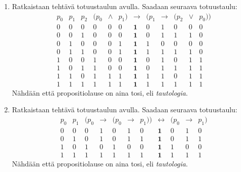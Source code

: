 \documentclass[12pt,a4paper]{article}
\begin{document}
\begin{solution}
\leavevmode\par
\begin{enumerate}[label=\alph*), nosep]
\item Ratkaistaan tehtävä totuustaulun avulla. Saadaan seuraava totuustaulu:
\[
\begin{array}{ccc|ccccccccc}
p_0 & p_1 & p_2
& (p_0 & \land & p_1)
& \boldsymbol{\to}
& (p_1 & \to & (p_2 & \lor & p_0)) \\
\hline
0 & 0 & 0
& 0 & 0 & 0
& \mathbf{1}
& 0 & 1 & 0 & 0 & 0 \\

0 & 0 & 1
& 0 & 0 & 0
& \mathbf{1}
& 0 & 1 & 1 & 1 & 0 \\

0 & 1 & 0
& 0 & 0 & 1
& \mathbf{1}
& 1 & 0 & 0 & 0 & 0 \\

0 & 1 & 1
& 0 & 0 & 1
& \mathbf{1}
& 1 & 1 & 1 & 1 & 0 \\

1 & 0 & 0
& 1 & 0 & 0
& \mathbf{1}
& 0 & 1 & 0 & 1 & 1 \\

1 & 0 & 1
& 1 & 0 & 0
& \mathbf{1}
& 0 & 1 & 1 & 1 & 1 \\

1 & 1 & 0
& 1 & 1 & 1
& \mathbf{1}
& 1 & 1 & 0 & 1 & 1 \\

1 & 1 & 1
& 1 & 1 & 1
& \mathbf{1}
& 1 & 1 & 1 & 1 & 1
\end{array}
\]
Nähdään että propositiolause on aina tosi, eli \emph{tautologia}.

\item Ratkaistaan tehtävä totuustaulun avulla. Saadaan seuraava totuustaulu:
\[
\begin{array}{cc|ccccccccc}
p_0 & p_1
& (p_0 & \to & (p_0 & \to & p_1))
& \boldsymbol{\leftrightarrow}
& (p_0 & \to & p_1) \\
\hline
0 & 0
& 0 & 1 & 0 & 1 & 0
& \mathbf{1}
& 0 & 1 & 0 \\

0 & 1
& 0 & 1 & 0 & 1 & 1
& \mathbf{1}
& 0 & 1 & 1 \\

1 & 0
& 1 & 0 & 1 & 0 & 0
& \mathbf{1}
& 1 & 0 & 0 \\

1 & 1
& 1 & 1 & 1 & 1 & 1
& \mathbf{1}
& 1 & 1 & 1
\end{array}
\]
Nähdään että propositiolause on aina tosi, eli \emph{tautologia}.
\end{enumerate}
\end{solution}
\end{document}
